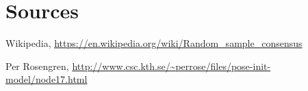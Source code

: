 \documentclass[11pt]{article}
\begin{document}
\pagebreak
\section*{Sources}
\begin{description}[labelindent=16pt,style=multiline,leftmargin=4cm, noitemsep]
	\item[RANSAC:] Wikipedia, \url{https://en.wikipedia.org/wiki/Random_sample_consensus}
	\item[Calculating Homography:] Per Rosengren, \url{http://www.csc.kth.se/~perrose/files/pose-init-model/node17.html}
\end{description}
\end{document}
